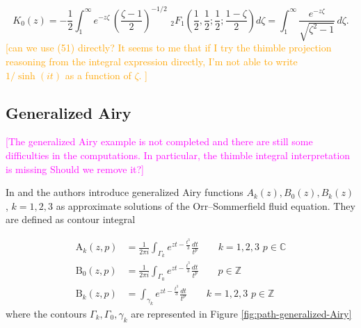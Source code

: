 \documentclass{article}
\theoremstyle{definition}
\newcommand{\Z}{\mathbb{Z}}
\newcommand{\C}{\mathbb{C}}
\begin{document}
\begin{equation}
    K_0(z)=-\frac{1}{2}\int_1^\infty e^{-z\zeta} \, \left(\frac{\zeta-1}{2}\right)^{-1/2} \,\, {}_2F_1\left(\frac{1}{2}, \frac{1}{2};\frac{1}{2};\frac{1-\zeta}{2}\right)  d\zeta =  \int_1^\infty \frac{e^{-z\zeta}}{\sqrt{\zeta^2-1}} \, d\zeta .
\end{equation}
\textcolor{orange}{[can we use (51) directly? It seems to me that if I try the thimble projection reasoning from the integral expression directly, I'm not able to write $1/\sinh(it)$ as a function of $\zeta$. ]}



\subsection{Generalized Airy}

\textcolor{magenta}{[The generalized Airy example is not completed and there are still some difficulties in the computations. In particular, the thimble integral interpretation is missing Should we remove it?]}

In \cite{Reid} and \cite[Appendix]{drazin-reid} the authors introduce generalized Airy functions $A_k(z), B_0(z), B_k(z)$, $k=1,2,3$ as approximate solutions of the Orr--Sommerfield fluid equation. They are defined as contour integral \cite[Section 9.13(ii)]{dlmf}

\begin{align*}
\mathrm{A}_k(z,p)&=\frac{1}{2\pi i}\int_{\Gamma_k}e^{zt-\tfrac{t^3}{3}}\frac{dt}{t^p} \qquad k=1,2,3\,\, p\in\C \\
\mathrm{B}_0(z,p)&=\frac{1}{2\pi i}\int_{\Gamma_0}e^{zt-\tfrac{t^3}{3}}\frac{dt}{t^p} \qquad p\in\Z \\
\mathrm{B}_k(z,p)&=\int_{\gamma_k}e^{zt-\tfrac{t^3}{3}}\frac{dt}{t^p} \qquad k=1,2,3\,\, p\in\Z 
\end{align*}
where the contours $\Gamma_k, \Gamma_0, \gamma_k$ are represented in Figure \ref{fig:path-generalized-Airy} 
\end{document}
